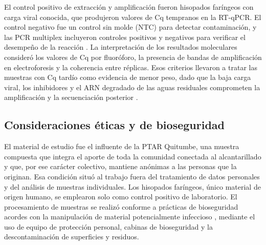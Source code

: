 El control positivo de extracción y amplificación fueron hisopados faríngeos con carga viral conocida, que produjeron valores de Cq tempranos en la RT-qPCR. El control negativo fue un control sin molde (NTC) para detectar contaminación, y las PCR multiplex incluyeron controles positivos y negativos para verificar el desempeño de la reacción \cite{NEB_2021}. La interpretación de los resultados moleculares consideró los valores de Cq por fluoróforo, la presencia de bandas de amplificación en electroforesis y la coherencia entre réplicas. Esos criterios llevaron a tratar las muestras con Cq tardío como evidencia de menor peso, dado que la baja carga viral, los inhibidores y el ARN degradado de las aguas residuales comprometen la amplificación y la secuenciación posterior \cite{Parkins_2023,MejiaCalle_2024}.

\subsection{Consideraciones éticas y de bioseguridad}

El material de estudio fue el influente de la PTAR Quitumbe, una muestra compuesta que integra el aporte de toda la comunidad conectada al alcantarillado y que, por ese carácter colectivo, mantiene anónimas a las personas que la originan. Esa condición situó al trabajo fuera del tratamiento de datos personales y del análisis de muestras individuales. Los hisopados faríngeos, único material de origen humano, se emplearon solo como control positivo de laboratorio. El procesamiento de muestras se realizó conforme a prácticas de bioseguridad acordes con la manipulación de material potencialmente infeccioso \cite{WHO_2020}, mediante el uso de equipo de protección personal, cabinas de bioseguridad y la descontaminación de superficies y residuos.
